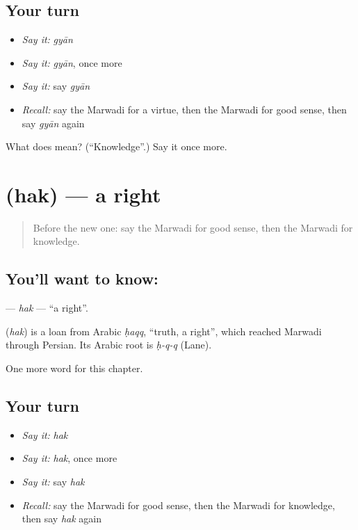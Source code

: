\subsection*{Your turn}
\begin{itemize}
\raggedright
  \item \emph{Say it:} \emph{gyān}
  \item \emph{Say it:} \emph{gyān}, once more
  \item \emph{Say it:} say \emph{gyān}
  \item \emph{Recall:} say the Marwadi for a virtue, then the Marwadi for good sense, then say \emph{gyān} again
\end{itemize}

\begin{tcolorbox}[breakable,colback=teal!4,colframe=teal!35!black,title={Before you move on}]
What does  mean? (\textquotedblleft{}Knowledge\textquotedblright{}.) Say it once more.
\end{tcolorbox}
\section[\texorpdfstring{\mw{हक} (hak)}{हक (hak)}]{ (hak) — a right}

\label{lesson:MW-C116-hak}



\begin{quote}
Before the new one: say the Marwadi for good sense, then the Marwadi for knowledge.
\end{quote}

\subsection*{You'll want to know: }
\textbf{} — \emph{hak} — \textquotedblleft{}a right\textquotedblright{}.

\begin{cousinweb}
\textbf{} (\emph{hak}) is a loan from Arabic \emph{ḥaqq}, \textquotedblleft{}truth, a right\textquotedblright{}, which reached Marwadi through Persian. Its Arabic root is \emph{ḥ-q-q} (Lane).
\end{cousinweb}

\begin{grammarlens}[title={What you've built}]
One more word for this chapter.
\end{grammarlens}

\subsection*{Your turn}
\begin{itemize}
\raggedright
  \item \emph{Say it:} \emph{hak}
  \item \emph{Say it:} \emph{hak}, once more
  \item \emph{Say it:} say \emph{hak}
  \item \emph{Recall:} say the Marwadi for good sense, then the Marwadi for knowledge, then say \emph{hak} again
\end{itemize}

